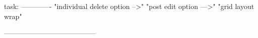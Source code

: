task:
-------------
"individual delete option -->"
"post edit option --->"
"grid layout wrap"

---------------------------------------

